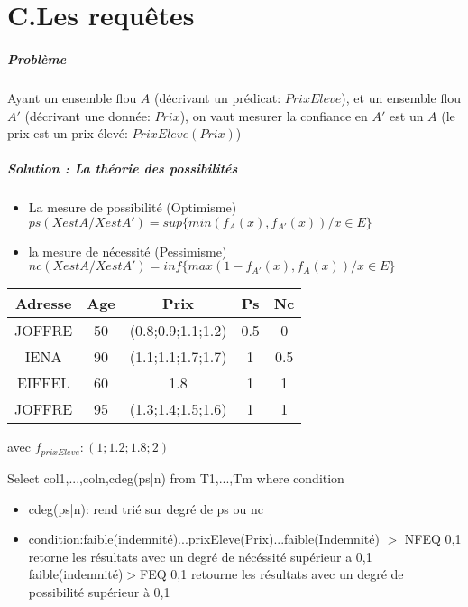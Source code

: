 \documentclass[10pt,a4paper]{report}
\begin{document}
\chapter{C.Les requêtes}
\paragraph{Problème\\}

Ayant un ensemble flou $ A $ (décrivant un prédicat: $PrixEleve$), et un ensemble flou $ A' $   (décrivant une donnée: $Prix$), on vaut mesurer la confiance en  $ A' $ est un $ A $ (le prix est un prix élevé: $PrixEleve(Prix)$)

\paragraph{Solution : La théorie des possibilités\\}
\begin{itemize}
\item La mesure de possibilité (Optimisme)\\
$ ps(X est A / Xest A')=sup\{min(f_A(x),f_{A'}(x)) / x \in E\} $
\item la mesure de nécessité (Pessimisme)\\
$ nc(X est A / X est A')=inf \{max(1-f_{A'}(x), f_A(x)) / x \in E\} $
\end{itemize}

\begin{tabular}{|c|c|c|c|c|}
\hline 
Adresse & Age & Prix & Ps & Nc \\ 
\hline 
JOFFRE & 50 & (0.8;0.9;1.1;1.2) & 0.5 & 0 \\ 
\hline 
IENA & 90 & (1.1;1.1;1.7;1.7) & 1 & 0.5  \\ 
\hline 
EIFFEL & 60 & 1.8 & 1 & 1  \\ 
\hline 
JOFFRE & 95 & (1.3;1.4;1.5;1.6) & 1 & 1  \\ 
\hline 
\end{tabular} 

avec $f_{prixEleve}:(1;1.2;1.8;2)$


Select col1,...,coln,cdeg(ps|n)
from T1,...,Tm
where condition

\begin{itemize}
\item cdeg(ps|n): rend trié sur degré de ps ou nc
\item condition:faible(indemnité)...prixEleve(Prix)...faible(Indemnité) $>$ NFEQ 0,1 retorne les résultats avec un degré de nécéssité supérieur a 0,1\\
faible(indemnité)$>$FEQ 0,1 retourne les résultats avec un degré de possibilité supérieur à 0,1
\end{itemize}
\end{document}
